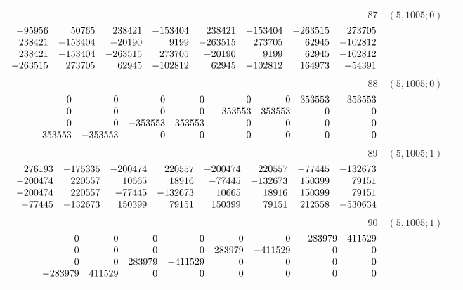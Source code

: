 \documentclass[11pt]{article}
\theoremstyle{remark}
\numberwithin{equation}{section}
\begin{document}
\begin{longtable}{rcl}
87 & $(5,1005;0)$ & \begin{tabular}[t]{@{}l@{}}$w_i=\displaystyle \frac{1091886607993667}{79953173520691200000000000000000000}$\\[3pt]{\scriptsize$\begin{array}{@{}rrrrrrrr@{}}-95956 & 50765 & 238421 & -153404 & 238421 & -153404 & -263515 & 273705\\238421 & -153404 & -20190 & 9199 & -263515 & 273705 & 62945 & -102812\\238421 & -153404 & -263515 & 273705 & -20190 & 9199 & 62945 & -102812\\-263515 & 273705 & 62945 & -102812 & 62945 & -102812 & 164973 & -54391\end{array}$}\end{tabular}\\[8pt]
88 & $(5,1005;0)$ & \begin{tabular}[t]{@{}l@{}}$w_i=\displaystyle \frac{1654874217157843}{6234361224973875000000000000000000}$\\[3pt]{\scriptsize$\begin{array}{@{}rrrrrrrr@{}}0 & 0 & 0 & 0 & 0 & 0 & 353553 & -353553\\0 & 0 & 0 & 0 & -353553 & 353553 & 0 & 0\\0 & 0 & -353553 & 353553 & 0 & 0 & 0 & 0\\353553 & -353553 & 0 & 0 & 0 & 0 & 0 & 0\end{array}$}\end{tabular}\\[8pt]
89 & $(5,1005;1)$ & \begin{tabular}[t]{@{}l@{}}$w_i=\displaystyle \frac{887493888104349}{3788148743919044000000000000000000}$\\[3pt]{\scriptsize$\begin{array}{@{}rrrrrrrr@{}}276193 & -175335 & -200474 & 220557 & -200474 & 220557 & -77445 & -132673\\-200474 & 220557 & 10665 & 18916 & -77445 & -132673 & 150399 & 79151\\-200474 & 220557 & -77445 & -132673 & 10665 & 18916 & 150399 & 79151\\-77445 & -132673 & 150399 & 79151 & 150399 & 79151 & 212558 & -530634\end{array}$}\end{tabular}\\[8pt]
90 & $(5,1005;1)$ & \begin{tabular}[t]{@{}l@{}}$w_i=\displaystyle \frac{5120966254311011}{7285839369142031250000000000000000}$\\[3pt]{\scriptsize$\begin{array}{@{}rrrrrrrr@{}}0 & 0 & 0 & 0 & 0 & 0 & -283979 & 411529\\0 & 0 & 0 & 0 & 283979 & -411529 & 0 & 0\\0 & 0 & 283979 & -411529 & 0 & 0 & 0 & 0\\-283979 & 411529 & 0 & 0 & 0 & 0 & 0 & 0\end{array}$}\end{tabular}\\[8pt]

\end{longtable}
\end{document}
